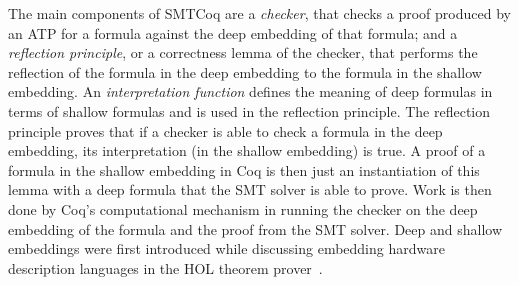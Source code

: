 \documentclass{article}
\begin{document}
	The main components of SMTCoq are 
	a \textit{checker}, that checks 
	a proof produced by an ATP for a 
	formula against the deep embedding 
	of that formula; and a 
	\textit{reflection principle}, 
	or a correctness lemma of the checker,
	that performs the reflection of the 
	formula	in the deep embedding to the 
	formula in the shallow embedding. 
	An \textit{interpretation function}
	defines the meaning of deep 
	formulas in terms of shallow formulas
	and is used in the reflection 
	principle. The reflection principle 
	proves that if a checker is able to 
	check a formula in the deep embedding,
	its interpretation (in the shallow 
	embedding) is true. A proof of 
	a formula in the shallow embedding 
	in Coq is then just an instantiation 
	of this lemma with a deep formula that 
	the SMT solver is able to prove.
	Work is then done by Coq's 
	computational mechanism in running
	the checker on the deep embedding 
	of the formula and the proof 
	from the SMT solver. Deep and shallow 
	embeddings were first introduced 
	while discussing embedding 
	hardware description languages 
	in the HOL theorem 
	prover~\cite{10.5555/645902.672777}.
	
\end{document}
